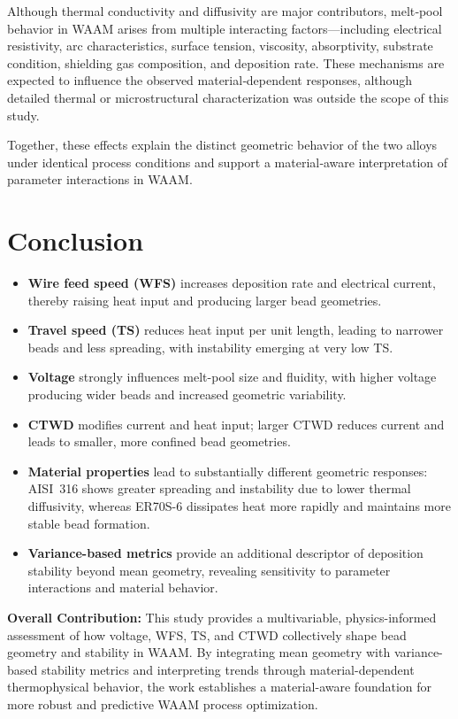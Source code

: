 \documentclass[conference]{IEEEtran}
\begin{document}
Although thermal conductivity and diffusivity are major contributors, melt‑pool behavior in WAAM arises from multiple interacting factors—including electrical resistivity, arc characteristics, surface tension, viscosity, absorptivity, substrate condition, shielding gas composition, and deposition rate. These mechanisms are expected to influence the observed material‑dependent responses, although detailed thermal or microstructural characterization was outside the scope of this study.

Together, these effects explain the distinct geometric behavior of the two alloys under identical process conditions and support a material‑aware interpretation of parameter interactions in WAAM.

\section{Conclusion}

\begin{itemize}
    \item \textbf{Wire feed speed (WFS)} increases deposition rate and electrical current, thereby raising heat input and producing larger bead geometries.
    \item \textbf{Travel speed (TS)} reduces heat input per unit length, leading to narrower beads and less spreading, with instability emerging at very low TS.
    \item \textbf{Voltage} strongly influences melt-pool size and fluidity, with higher voltage producing wider beads and increased geometric variability.
    \item \textbf{CTWD} modifies current and heat input; larger CTWD reduces current and leads to smaller, more confined bead geometries.
    \item \textbf{Material properties} lead to substantially different geometric responses: AISI~316 shows greater spreading and instability due to lower thermal diffusivity, whereas ER70S-6 dissipates heat more rapidly and maintains more stable bead formation.
    \item \textbf{Variance-based metrics} provide an additional descriptor of deposition stability beyond mean geometry, revealing sensitivity to parameter interactions and material behavior.
\end{itemize}

\noindent\textbf{Overall Contribution:}  
This study provides a multivariable, physics-informed assessment of how voltage, WFS, TS, and CTWD collectively shape bead geometry and stability in WAAM. By integrating mean geometry with variance-based stability metrics and interpreting trends through material-dependent thermophysical behavior, the work establishes a material-aware foundation for more robust and predictive WAAM process optimization.
\end{document}
